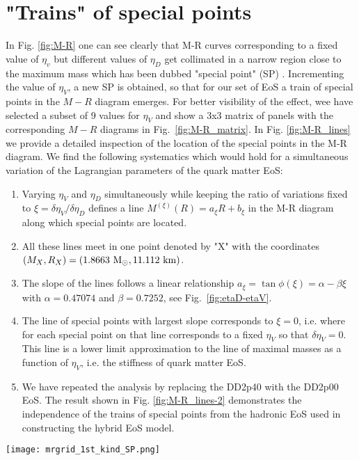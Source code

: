 \documentclass[%
 reprint,
superscriptaddress,
nofootinbib,
 amsmath,amssymb,
 aps,
]{revtex4-1}
\begin{document}
\section{"Trains" of special points}
\label{app:sp}
In Fig. \ref{fig:M-R} one can see clearly that M-R curves corresponding to a fixed value of $\eta_v$ but different values of $\eta_D$ get collimated in a narrow region close to the maximum mass which has been dubbed "special point" (SP)
\cite{Yudin:2014mla}. Incrementing the value of $\eta_V$, a new SP is obtained, so that for our set of EoS a train of special points in the $M-R$ diagram emerges.
For better visibility of the effect, wee have selected a subset of 9 values for $\eta_V$ and show a 3x3 matrix of panels
with the corresponding $M-R$ diagrams in Fig.~\ref{fig:M-R_matrix}.
%
In Fig. \ref{fig:M-R_lines} we provide a detailed inspection of the location of the special points in the M-R diagram.
We find the following systematics which would hold for a simultaneous variation of the Lagrangian parameters of the quark matter EoS:
\begin{enumerate}
    \item Varying $\eta_V$ and $\eta_D$ simultaneously while keeping the ratio of variations fixed to $\xi=\delta \eta_V/\delta \eta_D$ defines a line $M^{(\xi)}(R)=a_\xi R + b_\xi $ in the M-R diagram along which special points are located.
    \item All these lines meet in one point denoted by "X" with the coordinates $(M_X,R_X)=(1.8663~\textmd{M}_\odot, 11.112~{\rm km})$.
    \item The slope of the lines follows a linear relationship 
    $a_\xi = \tan \phi(\xi) = \alpha - \beta \xi$ with $\alpha=0.47074$ and $\beta=0.7252$, see Fig.~\ref{fig:etaD-etaV}.
    \item The line of special points with largest slope corresponds to $\xi=0$, i.e. where for each special point on that line corresponds to a fixed $\eta_V$ so that $\delta \eta_V=0$.  This line is a lower limit approximation to the line of maximal masses as a function of $\eta_V$, i.e. the stiffness of quark matter EoS.
    \item We have repeated the analysis by replacing the DD2p40 with the DD2p00 EoS. The result shown in Fig. \ref{fig:M-R_lines-2} demonstrates the independence of the trains of special points from the hadronic EoS used in constructing the hybrid EoS model.  
\end{enumerate}


\begin{figure*}[ht]
    \texttt{[image: mrgrid\_1st\_kind\_SP.png]}
    \caption{Mass-radius relation for all hybrid stars obtained by a Maxwell construction. The value of $\eta_V$ is taken to be fixed for each panel while the value of $\eta_D$ is varied.}
    \label{fig:M-R_matrix}
\end{figure*}
\end{document}
